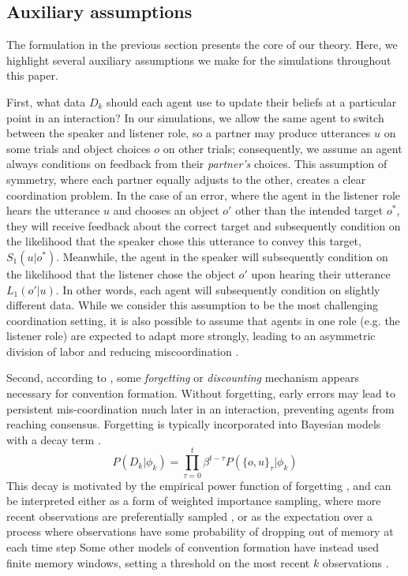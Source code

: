 \subsection{Auxiliary assumptions}

The formulation in the previous section presents the core of our theory.
Here, we highlight several auxiliary assumptions we make for the simulations throughout this paper.

First, what data $D_k$ should each agent use to update their beliefs at a particular point in an interaction?
In our simulations, we allow the same agent to switch between the speaker and listener role, so a partner may produce utterances $u$ on some trials and object choices $o$ on other trials; consequently, we assume an agent always conditions on feedback from their \emph{partner's} choices.
This assumption of symmetry, where each partner equally adjusts to the other, creates a clear coordination problem. 
In the case of an error, where the agent in the listener role hears the utterance $u$ and chooses an object $o'$ other than the intended target $o^*$, they will receive feedback about the correct target and subsequently condition on the likelihood that the speaker chose this utterance to convey this target, $S_1(u | o^*)$. 
Meanwhile, the agent in the speaker will subsequently condition on the likelihood that the listener chose the object $o'$ upon hearing their utterance $L_1(o' | u)$.
In other words, each agent will subsequently condition on slightly different data.
While we consider this assumption to be the most challenging coordination setting, it is also possible to assume that agents in one role (e.g. the listener role) are expected to adapt more strongly, leading to an asymmetric division of labor and reducing miscoordination \cite{MorenoBaggio14_AsymmetrySignaling}.

Second, according to , some \emph{forgetting} or \emph{discounting} mechanism appears necessary for convention formation. 
Without forgetting, early errors may lead to persistent mis-coordination much later in an interaction, preventing agents from reaching consensus.
Forgetting is typically incorporated into Bayesian models with a decay term \cite{anderson2000adaptive,angela2009sequential,fudenberg2014recency,kalm2018visual}.
$$P(D_k | \phi_k) = \prod_{\tau=0}^t \beta^{t-\tau} P(\{o,u\}_\tau | \phi_k)$$
This decay is motivated by the empirical power function of forgetting \cite{wixted1991form}, and can be interpreted either as a form of weighted importance sampling, where more recent observations are preferentially sampled \cite{pearl2010online}, or as the expectation over a process where observations have some probability of dropping out of memory at each time step 
Some other models of convention formation have instead used finite memory windows, setting a threshold on the most recent $k$ observations \cite{young_evolution_2015}.

